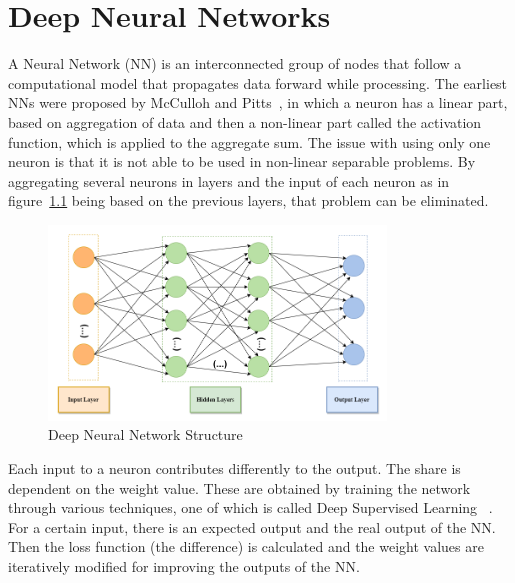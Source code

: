 \chapter{Deep Neural Networks}
\label{chapter:cnn}



A Neural Network (NN) is an interconnected group of nodes that follow a
computational model that propagates data forward while processing. The earliest
NNs were proposed by McCulloh and Pitts~\cite{neuron:model}, in which a neuron
has a linear part, based on aggregation of data and then a non-linear part
called the activation function, which is applied to the aggregate sum. The issue
with using only one neuron is that it is not able to be used in non-linear
separable problems. By aggregating several neurons in layers and the input of
each neuron as in figure~\ref{MLP} being based on the previous layers, that
problem can be eliminated.

\begin{figure}[!htbp]
    \centering
    \includegraphics[width=0.8\textwidth]{Figures/mlp.png}
    \caption{Deep Neural Network Structure}
    \label{MLP}
\end{figure} 

Each input to a neuron contributes differently to the output. The share is
dependent on the weight value. These are obtained by training the network
through various techniques, one of which is called Deep Supervised
Learning~\cite{deeplearning} . For a certain input, there is an expected output
and the real output of the NN. Then the loss function (the difference) is
calculated and the weight values are iteratively modified for improving the
outputs of the NN.

